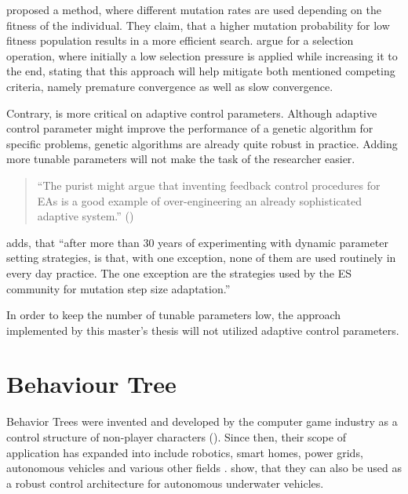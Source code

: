 \cite{marsili_libelli_adaptive_2000} proposed a method, where different mutation rates are used depending on the fitness of the individual. They claim, that a higher mutation probability for low fitness population results in a more efficient search. \cite{hussain_trade-off_2020} argue for a selection operation, where initially a low selection pressure is applied while increasing it to the end, stating that this approach will help mitigate both mentioned competing criteria, namely premature convergence as well as slow convergence.

Contrary, \cite{kacprzyk_parameter_2007} is more critical on adaptive control parameters. Although adaptive control parameter might improve the performance of a genetic algorithm for specific problems, genetic algorithms are already quite robust in practice. Adding more tunable parameters will not make the task of the researcher easier.

\begin{quote}
	\begin{em}
		\enquote{The purist might argue that inventing feedback control procedures for EAs is a good example of over-engineering an already sophisticated adaptive system.} (\cite{kacprzyk_parameter_2007})
	\end{em}
\end{quote}

\cite{kacprzyk_parameter_2007} adds, that \enquote{after more than 30 years of experimenting with dynamic parameter setting strategies, is that, with one exception, none of them are used routinely in every day practice. The one exception are the strategies used by the ES community for mutation step size adaptation.}

In order to keep the number of tunable parameters low, the approach implemented by this master's thesis will not utilized adaptive control parameters.

\section{Behaviour Tree}
Behavior Trees were invented and developed by the computer game industry as a control structure of non-player characters (\cite{collendanchise_behavior_2019}). Since then, their scope of application has expanded into include robotics, smart homes, power grids, autonomous vehicles and various other fields \cite{iovino_survey_2022}. \cite{sprague_improving_2018} show, that they can also be used as a robust control architecture for autonomous underwater vehicles.

